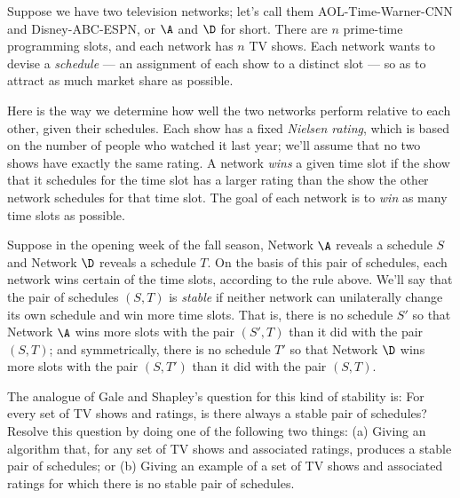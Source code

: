 \documentclass[12pt]{article}
\begin{document}
\begin{enumerate}
Suppose we have two television networks;
let's call them AOL-Time-Warner-CNN and Disney-ABC-ESPN,
or $\A$ and $\D$ for short.
There are $n$ prime-time programming slots, and
each network has $n$ TV shows.
Each network wants to devise a {\em schedule} ---
an assignment of each show to a distinct slot ---
so as to attract as much market share as possible.

Here is the way we determine how well the two networks
perform relative to each other, given their schedules.
Each show has a fixed {\em Nielsen rating}, which is based on the number
of people who watched it last year;
we'll assume that no two shows have exactly the same rating.
A network {\em wins} a given time slot if the show
that it schedules for the time slot has a larger rating
than the show the other network schedules for that time slot.
The goal of each network is to
{\em win} as many time slots as possible.

Suppose in the opening week of the fall season,
Network $\A$ reveals a schedule $S$ and
Network $\D$ reveals a schedule $T$.
On the basis of this pair of schedules, each
network wins certain of the time slots,
according to the rule above.
We'll say that the pair of schedules $(S,T)$ is
{\em stable} if neither network can unilaterally
change its own schedule and win more time slots.
That is, there is no schedule $S'$ so that Network $\A$
wins more slots with the pair $(S',T)$ than it
did with the pair $(S,T)$;
and symmetrically, there is no schedule $T'$ so that Network $\D$
wins more slots with the pair $(S,T')$ than it
did with the pair $(S,T)$.

The analogue of Gale and Shapley's question for this
kind of stability is:
For every set of TV shows and ratings,
is there always a stable pair of schedules?
Resolve this question by doing one of the following two things:
(a) Giving an algorithm that, for any set of TV shows
and associated ratings, produces a stable pair of schedules;
or (b) Giving an example of a set of TV shows and associated ratings
for which there is no stable pair of schedules.

\end{enumerate}
\end{document}

